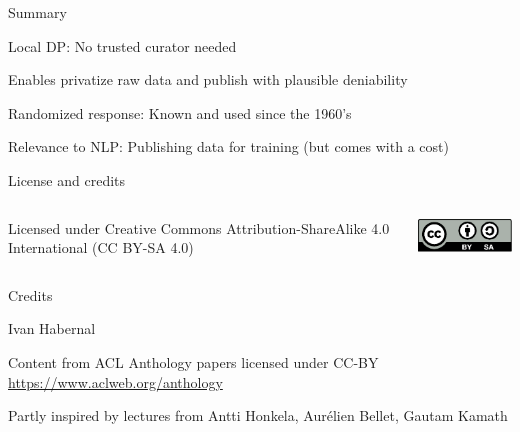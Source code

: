 \documentclass[12pt,aspectratio=169,handout]{beamer}
\begin{document}
\begin{frame}{Summary}

Local DP: No trusted curator needed

Enables privatize raw data and publish with plausible deniability

Randomized response: Known and used since the 1960's

Relevance to NLP: Publishing data for training (but comes with a cost)

\end{frame}




\begin{frame}{License and credits}

	\begin{columns}
		\begin{column}{0.7\textwidth}
			Licensed under Creative Commons Attribution-ShareAlike 4.0 International (CC BY-SA 4.0)
		\end{column}
		\begin{column}{0.2\textwidth}
			\includegraphics[width=0.9\linewidth]{img/cc-by-sa-icon.pdf}
		\end{column}
	\end{columns}
	
	\bigskip
	
	Credits
	
	\begin{scriptsize}
		
		Ivan Habernal
		
		Content from ACL Anthology papers licensed under CC-BY \url{https://www.aclweb.org/anthology}
		
		Partly inspired by lectures from Antti Honkela, Aurélien Bellet, Gautam Kamath
	
	\end{scriptsize}
	
\end{frame}
\end{document}
